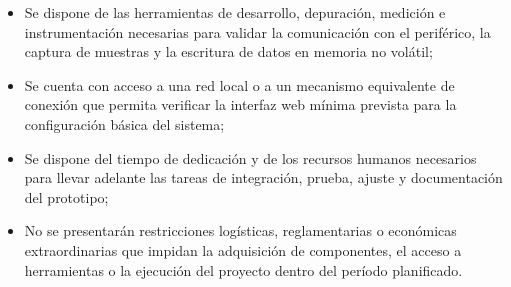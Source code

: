 \documentclass[
11pt, %
]{charter}
\begin{document}
\begin{itemize}
    \item Se dispone de las herramientas de desarrollo, depuración, medición e instrumentación necesarias para validar la comunicación con el periférico, la captura de muestras y la escritura de datos en memoria no volátil;
    
    \item Se cuenta con acceso a una red local o a un mecanismo equivalente de conexión que permita verificar la interfaz web mínima prevista para la configuración básica del sistema;
    
    \item Se dispone del tiempo de dedicación y de los recursos humanos necesarios para llevar adelante las tareas de integración, prueba, ajuste y documentación del prototipo;
    
    \item No se presentarán restricciones logísticas, reglamentarias o económicas extraordinarias que impidan la adquisición de componentes, el acceso a herramientas o la ejecución del proyecto dentro del período planificado.
\end{itemize}
\end{document}
